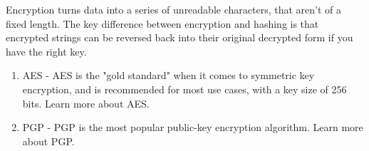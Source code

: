 \medskip
{}
    \begin{tcolorbox}
    [enhanced,
    title=Encryption,
    frame style=
    {left color=orange!85!black,right color=yellow!95!black}]

    Encryption turns data into a series of unreadable characters, that aren't of a fixed length. The key difference between encryption and hashing is that encrypted strings can be reversed back into their original decrypted form if you have the right key.

\tcblower

\footnotesize \begin{enumerate}
                    \item AES - AES is the "gold standard" when it comes to symmetric key encryption, and is recommended for most use cases, with a key size of 256 bits. Learn more about AES.

                    \item PGP - PGP is the most popular public-key encryption algorithm. Learn more about PGP.
                    
                \end{enumerate}

\end{tcolorbox}
\medskip


